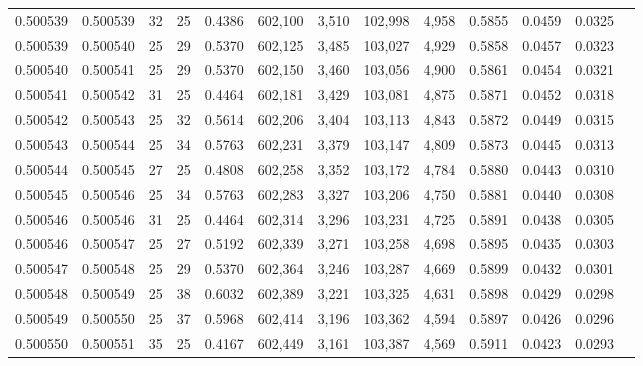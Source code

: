 \begin{tabular}{rrrrrrrrrrrrr}
0.500539 & 0.500539 &    32 &  25 &                                     0.4386 & 602,100 &   3,510 & 102,998 &   4,958 & 0.5855 & 0.0459 & 0.0325 \\
0.500539 & 0.500540 &    25 &  29 &                                     0.5370 & 602,125 &   3,485 & 103,027 &   4,929 & 0.5858 & 0.0457 & 0.0323 \\
0.500540 & 0.500541 &    25 &  29 &                                     0.5370 & 602,150 &   3,460 & 103,056 &   4,900 & 0.5861 & 0.0454 & 0.0321 \\
0.500541 & 0.500542 &    31 &  25 &                                     0.4464 & 602,181 &   3,429 & 103,081 &   4,875 & 0.5871 & 0.0452 & 0.0318 \\
0.500542 & 0.500543 &    25 &  32 &                                     0.5614 & 602,206 &   3,404 & 103,113 &   4,843 & 0.5872 & 0.0449 & 0.0315 \\
0.500543 & 0.500544 &    25 &  34 &                                     0.5763 & 602,231 &   3,379 & 103,147 &   4,809 & 0.5873 & 0.0445 & 0.0313 \\
0.500544 & 0.500545 &    27 &  25 &                                     0.4808 & 602,258 &   3,352 & 103,172 &   4,784 & 0.5880 & 0.0443 & 0.0310 \\
0.500545 & 0.500546 &    25 &  34 &                                     0.5763 & 602,283 &   3,327 & 103,206 &   4,750 & 0.5881 & 0.0440 & 0.0308 \\
0.500546 & 0.500546 &    31 &  25 &                                     0.4464 & 602,314 &   3,296 & 103,231 &   4,725 & 0.5891 & 0.0438 & 0.0305 \\
0.500546 & 0.500547 &    25 &  27 &                                     0.5192 & 602,339 &   3,271 & 103,258 &   4,698 & 0.5895 & 0.0435 & 0.0303 \\
0.500547 & 0.500548 &    25 &  29 &                                     0.5370 & 602,364 &   3,246 & 103,287 &   4,669 & 0.5899 & 0.0432 & 0.0301 \\
0.500548 & 0.500549 &    25 &  38 &                                     0.6032 & 602,389 &   3,221 & 103,325 &   4,631 & 0.5898 & 0.0429 & 0.0298 \\
0.500549 & 0.500550 &    25 &  37 &                                     0.5968 & 602,414 &   3,196 & 103,362 &   4,594 & 0.5897 & 0.0426 & 0.0296 \\
0.500550 & 0.500551 &    35 &  25 &                                     0.4167 & 602,449 &   3,161 & 103,387 &   4,569 & 0.5911 & 0.0423 & 0.0293 \\

\end{tabular}
